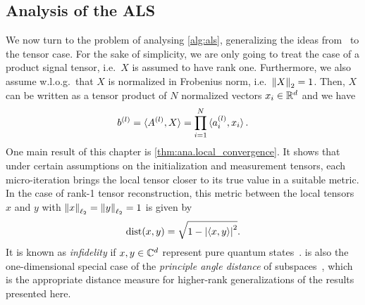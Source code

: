 \subsection{Analysis of the ALS}%
\label{sub:als.ana}

We now turn to the problem of analysing \cref{alg:als}, generalizing the ideas from~\cite{Zhong} to the tensor case.
For the sake of simplicity, we are only going to treat the case of a product signal tensor, i.e.\ $X$ is assumed to have rank one.
Furthermore, we also assume w.l.o.g.\ that $X$ is normalized in Frobenius norm, i.e.\ ${\Vert X\Vert}_2 = 1$.
Then, $X$ can be written as a tensor product of $N$ normalized vectors $x_i \in {\mathbb{R}}^d$ and we have
\[
  b^{(l)} = \braket{A^{(l)}, X} = \prod_{i=1}^N \braket{a^{(l)}_i, x_i}.
  \label{eq:ana.b_as_product}
\]
One main result of this chapter is \cref{thm:ana.local_convergence}.
It shows that under certain assumptions on the initialization and measurement tensors, each micro-iteration brings the local tensor closer to its true value in a suitable metric.
In the case of rank-1 tensor reconstruction, this metric between the local tensors $x$ and $y$ with ${\Vert x\Vert}_{\ell_2} = {\Vert y\Vert}_{\ell_2} = 1$ is given by
\[
  \mathrm{dist}(x, y) = \sqrt{1 - {\left\vert\braket{x, y}\right\vert}^2}.
  \label{eq:ana.infidelity}
\]
It is known as \emph{infidelity} if $x, y \in {\mathbb{C}}^d$ represent pure quantum states~\cite{Nielsen_2010_Quantum}.
 is also the one-dimensional special case of the \emph{principle angle distance} of subspaces~\cite{Golub}, which is the appropriate distance measure for higher-rank generalizations of the results presented here.

